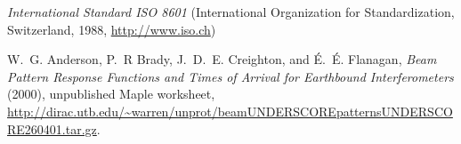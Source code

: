 \begin{thebibliography}{1}
  \textit{International Standard ISO 8601} (International Organization for
  Standardization, Switzerland, 1988, \url{http://www.iso.ch})

 W.~G. Anderson, P.~R Brady, J.~D.~E. Creighton,
  and \'E.~\'E. Flanagan, \emph{Beam Pattern Response Functions and
  Times of Arrival for Earthbound Interferometers} (2000), unpublished
  Maple worksheet,
  \url{http://dirac.utb.edu/~warren/unprot/beamUNDERSCOREpatternsUNDERSCORE260401.tar.gz}.

\end{thebibliography}

